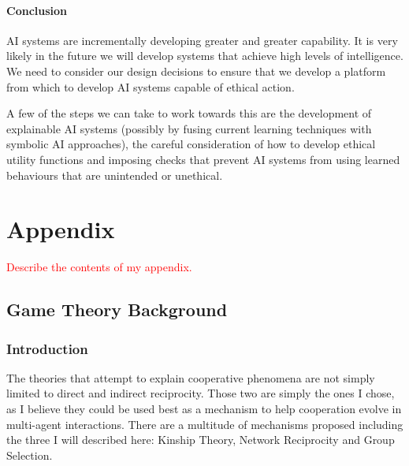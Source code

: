 \documentclass[]{final_report}
\begin{document}
\subsubsection{Conclusion}
AI systems are incrementally developing greater and greater capability. It is very likely in the future we will develop systems that achieve high levels of intelligence. We need to consider our design decisions to ensure that we develop a platform from which to develop AI systems capable of ethical action.\par 
A few of the steps we can take to work towards this are the development of explainable AI systems (possibly by fusing current learning techniques with symbolic AI approaches), the careful consideration of how to develop ethical utility functions and imposing checks that prevent AI systems from using learned behaviours that are unintended or unethical.

\chapter{Appendix}
\label{appendix}
\textcolor{red}{Describe the contents of my appendix.}
\section{Game Theory Background}
\subsection{Introduction}
The theories that attempt to explain cooperative phenomena are not simply limited to direct and indirect reciprocity. Those two are simply the ones I chose, as I believe they could be used best as a mechanism to help cooperation evolve in multi-agent interactions. There are a multitude of mechanisms proposed including the three I will described here: Kinship Theory, Network Reciprocity and Group Selection.
\end{document}
